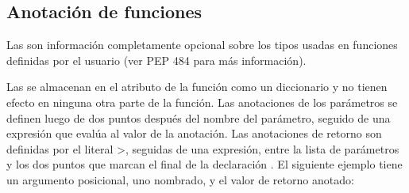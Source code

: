 \documentclass[a5paper,10pt,spanish]{sphinxmanual}
\begin{document}
\subsection{Anotación de funciones}
\label{\detokenize{tutorial/controlflow:function-annotations}}\label{\detokenize{tutorial/controlflow:tut-annotations}}
\ignorespaces 
\sphinxAtStartPar
Las  son información completamente opcional sobre los tipos usadas en funciones definidas por el usuario (ver PEP 484 para más información).

\sphinxAtStartPar
Las {\hyperref[\detokenize{glossary:term-function-annotation}]{}} se almacenan en el atributo  de la función como un diccionario y no tienen efecto en ninguna otra parte de la función. Las anotaciones de los parámetros se definen luego de dos puntos después del nombre del parámetro, seguido de una expresión que evalúa al valor de la anotación. Las anotaciones de retorno son definidas por el literal \sphinxhyphen{}>, seguidas de una expresión, entre la lista de parámetros y los dos puntos que marcan el final de la declaración . El siguiente ejemplo tiene un argumento posicional, uno nombrado, y el valor de retorno anotado:

\begin{sphinxVerbatim}[commandchars=\\\{\}]
        
     
      
         
\end{sphinxVerbatim}
\end{document}
